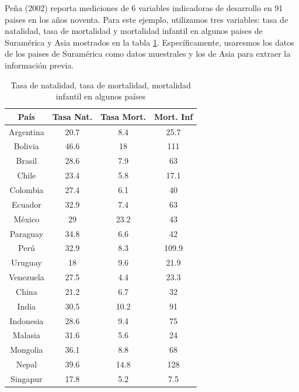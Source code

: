 \begin{Eje}
Peña (2002) reporta mediciones de 6 variables indicadoras de desarrollo en 91 paises en los años noventa. Para este ejemplo, utilizamos tres variables: tasa de natalidad, tasa de mortalidad y mortalidad infantil en algunos paises de Suramérica y Asia mostrados en la tabla \ref{Natalidad}. Específicamente, usaresmos los datos de los paises de Suramérica como datos muestrales y los de Asia para extraer la información previa.
\begin{table}[!htb]\centering
\begin{tabular}{cccc}\hline
País&Tasa Nat.&Tasa Mort.&Mort. Inf\\\hline
Argentina&20.7&8.4&25.7\\
Bolivia&46.6&18&111\\
Brasil&28.6&7.9&63\\
Chile&23.4&5.8&17.1\\
Colombia&27.4&6.1&40\\
Ecuador&32.9&7.4&63\\
México&29&23.2&43\\
Paraguay&34.8&6.6&42\\
Perú&32.9&8.3&109.9\\
Uruguay&18&9.6&21.9\\
Venezuela&27.5&4.4&23.3\\
China&21.2&6.7&32\\
India&30.5&10.2&91\\
Indonesia&28.6&9.4&75\\
Malasia&31.6&5.6&24\\
Mongolia&36.1&8.8&68\\
Nepal&39.6&14.8&128\\
Singapur&17.8&5.2&7.5\\\hline
\end{tabular}
\caption{Tasa de natalidad, tasa de mortalidad, mortalidad infantil en algunos países}\label{Natalidad}
\end{table}


\end{Eje}
